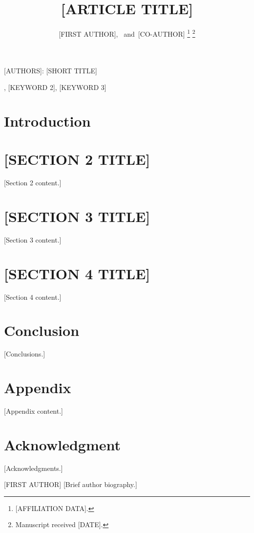 \documentclass[journal]{IEEEtran}
\begin{document}
\title{[ARTICLE TITLE]}

\author{[FIRST AUTHOR],~
        and~[CO-AUTHOR]%
\thanks{[AFFILIATION DATA].}%
\thanks{Manuscript received [DATE].}}

%
{[AUTHORS]: [SHORT TITLE]}

\maketitle

\begin{abstract}
\end{abstract}

\begin{IEEEkeywords}
[KEYWORD 1], [KEYWORD 2], [KEYWORD 3]
\end{IEEEkeywords}

\IEEEpeerreviewmaketitle


\section{Introduction}
\label{sec:intro}



\section{[SECTION 2 TITLE]}
\label{sec:section2}

[Section 2 content.]


\section{[SECTION 3 TITLE]}
\label{sec:section3}

[Section 3 content.]


\section{[SECTION 4 TITLE]}
\label{sec:section4}

[Section 4 content.]


\section{Conclusion}
\label{sec:conclusion}

[Conclusions.]


\appendices
\section{Appendix}
[Appendix content.]


\section*{Acknowledgment}

[Acknowledgments.]






\begin{IEEEbiographynophoto}{[FIRST AUTHOR]}
[Brief author biography.]
\end{IEEEbiographynophoto}
\end{document}
